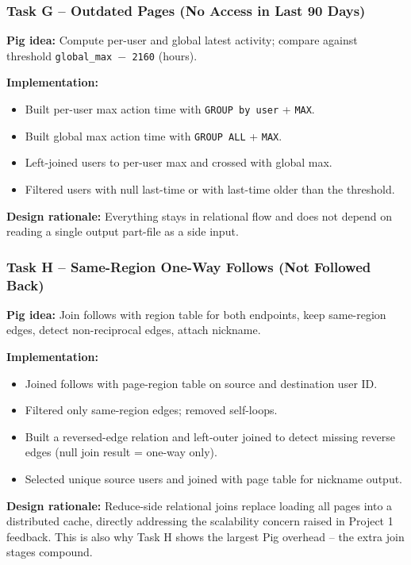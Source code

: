 \documentclass[11pt]{article}
\begin{document}
\subsubsection*{Task G -- Outdated Pages (No Access in Last 90 Days)}

\textbf{Pig idea:} Compute per-user and global latest activity; compare against threshold \texttt{global\_max $-$ 2160} (hours).

\textbf{Implementation:}
\begin{itemize}[noitemsep,topsep=2pt]
  \item Built per-user max action time with \texttt{GROUP by user} + \texttt{MAX}.
  \item Built global max action time with \texttt{GROUP ALL} + \texttt{MAX}.
  \item Left-joined users to per-user max and crossed with global max.
  \item Filtered users with null last-time or with last-time older than the threshold.
\end{itemize}

\textbf{Design rationale:} Everything stays in relational flow and does not depend on reading a single output part-file as a side input.

\subsubsection*{Task H -- Same-Region One-Way Follows (Not Followed Back)}

\textbf{Pig idea:} Join follows with region table for both endpoints, keep same-region edges, detect non-reciprocal edges, attach nickname.

\textbf{Implementation:}
\begin{itemize}[noitemsep,topsep=2pt]
  \item Joined follows with page-region table on source and destination user ID.
  \item Filtered only same-region edges; removed self-loops.
  \item Built a reversed-edge relation and left-outer joined to detect missing reverse edges (null join result = one-way only).
  \item Selected unique source users and joined with page table for nickname output.
\end{itemize}

\textbf{Design rationale:} Reduce-side relational joins replace loading all pages into a distributed cache, directly addressing the scalability concern raised in Project 1 feedback. This is also why Task H shows the largest Pig overhead -- the extra join stages compound.
\end{document}
